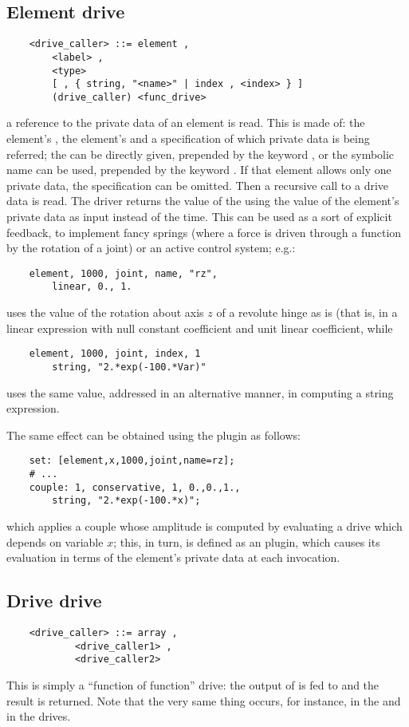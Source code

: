 \subsection{Element drive}\label{sec:DRIVE-ELEMENT}
\begin{verbatim}
    <drive_caller> ::= element ,
        <label> ,
        <type>
        [ , { string, "<name>" | index , <index> } ]
        (drive_caller) <func_drive>
\end{verbatim}
a reference to the private data of an element is read.
This is made of: the element's , the element's 
and a specification of which private data is being referred;
the  can be directly given, prepended by the keyword
, or the symbolic name can be used, prepended by 
the keyword .
If that element allows only one private data, the specification 
can be omitted.
Then a recursive call to a drive data is read. 
The driver returns the value of the  
 using the value of the 
element's private data as input instead of the time. 
This can be used as a sort of explicit feedback, to implement fancy
springs (where a force is driven through a function by the rotation
of a joint) or an active control system; e.g.:
\begin{verbatim}
    element, 1000, joint, name, "rz",
        linear, 0., 1.
\end{verbatim}
uses the value of the rotation about axis $z$ of a revolute hinge
as is (that is, in a linear expression with null constant coefficient 
and unit linear coefficient, while
\begin{verbatim}
    element, 1000, joint, index, 1
        string, "2.*exp(-100.*Var)"
\end{verbatim}
uses the same value, addressed in an alternative manner, in computing
a string expression.

\noindent
The same effect can be obtained using the  plugin as follows:
\begin{verbatim}
    set: [element,x,1000,joint,name=rz];
    # ...
    couple: 1, conservative, 1, 0.,0.,1.,
        string, "2.*exp(-100.*x)";
\end{verbatim}
which applies a couple whose amplitude is computed by evaluating
a  drive which depends on variable $x$; this, in turn,
is defined as an  plugin, which causes its evaluation
in terms of the element's private data at each invocation.

\subsection{Drive drive}
\begin{verbatim}
    <drive_caller> ::= array ,
            <drive_caller1> , 
            <drive_caller2>
\end{verbatim}
This is simply a ``function of function'' drive: the output 
of  is fed to 
and the result is returned.
Note that the very same thing occurs, for instance, in the
 and in the  drives.

